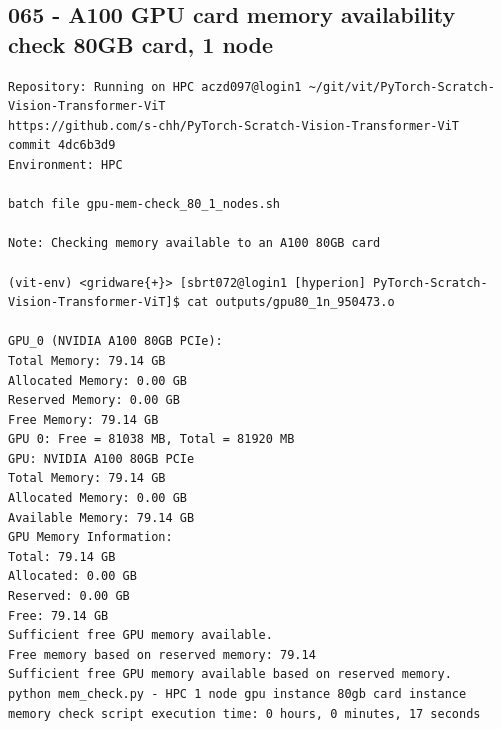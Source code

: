 \subsection{065 - A100 GPU card memory availability check 80GB card, 1 node}
\label{app_res:065}
\begin{verbatim}
Repository: Running on HPC aczd097@login1 ~/git/vit/PyTorch-Scratch-Vision-Transformer-ViT
https://github.com/s-chh/PyTorch-Scratch-Vision-Transformer-ViT
commit 4dc6b3d9
Environment: HPC

batch file gpu-mem-check_80_1_nodes.sh

Note: Checking memory available to an A100 80GB card 

(vit-env) <gridware{+}> [sbrt072@login1 [hyperion] PyTorch-Scratch-Vision-Transformer-ViT]$ cat outputs/gpu80_1n_950473.o

GPU_0 (NVIDIA A100 80GB PCIe):
Total Memory: 79.14 GB
Allocated Memory: 0.00 GB
Reserved Memory: 0.00 GB
Free Memory: 79.14 GB
GPU 0: Free = 81038 MB, Total = 81920 MB
GPU: NVIDIA A100 80GB PCIe
Total Memory: 79.14 GB
Allocated Memory: 0.00 GB
Available Memory: 79.14 GB
GPU Memory Information:
Total: 79.14 GB
Allocated: 0.00 GB
Reserved: 0.00 GB
Free: 79.14 GB
Sufficient free GPU memory available.
Free memory based on reserved memory: 79.14
Sufficient free GPU memory available based on reserved memory.
python mem_check.py - HPC 1 node gpu instance 80gb card instance memory check script execution time: 0 hours, 0 minutes, 17 seconds
            
\end{verbatim}


